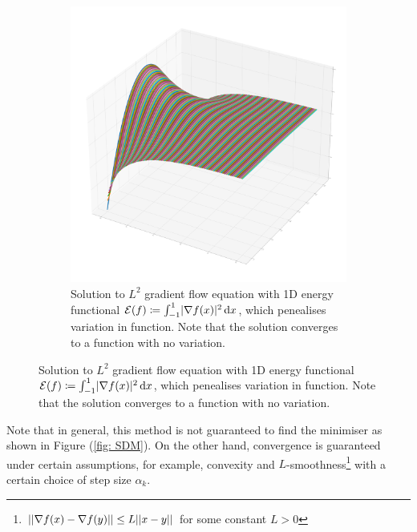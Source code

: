 \documentclass[../dissertation.tex]{subfiles}
\begin{document}
\begin{figure}[tbp]
\begin{subfigure}[b]{0.4\textwidth}
        \includegraphics[width=\textwidth]{sections/gradientFlowImgs/gf}
        \caption{Solution to $L^2$ gradient flow equation with 1D energy functional $\mathcal{E} (f) \coloneqq \int_{-1}^1 \lvert\nabla f(x)\lvert^2 \, \text{d} x$, which penealises variation in function. Note that the solution converges to a function with no variation.}
        \label{fig: GF}
    \end{subfigure}
\end{figure}
Note that in general, this method is not guaranteed to find the minimiser as shown in Figure (\ref{fig: SDM}).
On the other hand, convergence is guaranteed under certain assumptions, for example, convexity and $L$-smoothness\footnote{$\lvert \lvert \nabla f(x) - \nabla f(y) \rvert \rvert \leq L \lvert \lvert x-y \rvert \rvert$ for some constant $L > 0$}
with a certain choice of step size $\alpha_k$.
\end{document}
